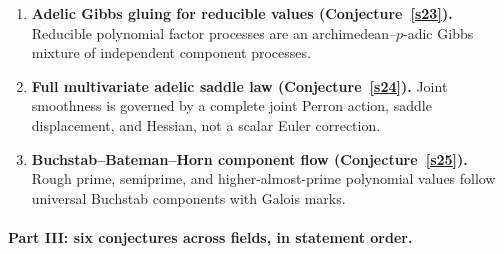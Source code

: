 \documentclass[11pt]{article}
\theoremstyle{definition}
\begin{document}
\begin{enumerate}
\item \textbf{Adelic Gibbs gluing for reducible values (Conjecture~\ref{s23}).}  Reducible polynomial factor processes are an archimedean--$p$-adic Gibbs mixture of independent component processes.
\item \textbf{Full multivariate adelic saddle law (Conjecture~\ref{s24}).}  Joint smoothness is governed by a complete joint Perron action, saddle displacement, and Hessian, not a scalar Euler correction.
\item \textbf{Buchstab--Bateman--Horn component flow (Conjecture~\ref{s25}).}  Rough prime, semiprime, and higher-almost-prime polynomial values follow universal Buchstab components with Galois marks.
\end{enumerate}

\paragraph{Part III: six conjectures across fields, in statement order.}
\end{document}
